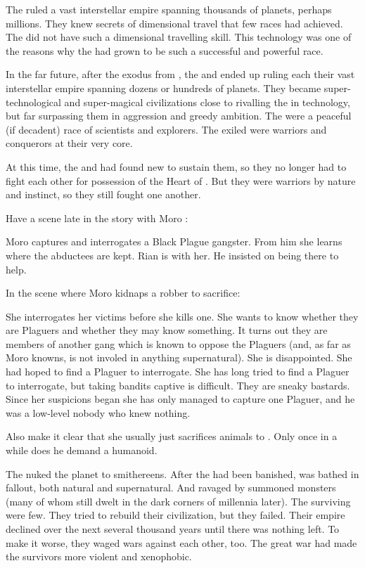 The \xss ruled a vast interstellar empire spanning thousands of planets, perhaps millions. 
They knew secrets of dimensional travel that few races had achieved.
The \banes did not have such a dimensional travelling skill. 
This technology was one of the reasons why the \xss had grown to be such a successful and powerful race. 


In the far future, after the exodus from \Miith, the \dragons and \resphain ended up ruling each their vast interstellar empire spanning dozens or hundreds of planets. 
They became super-technological and super-magical civilizations close to rivalling the \voyagers in technology, but far surpassing them in aggression and greedy ambition. 
The \voyagers were a peaceful (if decadent) race of scientists and explorers. 
The exiled \Miithians were warriors and conquerors at their very core.

At this time, the \dragons and \resphain had found new \dweomers to sustain them, so they no longer had to fight each other for possession of the Heart of \Miith. 
But they were warriors by nature and instinct, so they still fought one another. 



Have a scene late in the story with Moro \Cornel:

  Moro captures and interrogates a Black Plague gangster.
  From him she learns where the abductees are kept. 
  Rian is with her.
  He insisted on being there to help.

In the scene where Moro kidnaps a robber to sacrifice:

  She interrogates her victims before she kills one.
  She wants to know whether they are Plaguers and whether they may know something.
  It turns out they are members of another gang which is known to oppose the Plaguers (and, as far as Moro knowns, is not involed in anything supernatural). 
  She is disappointed.
  She had hoped to find a Plaguer to interrogate.
  She has long tried to find a Plaguer to interrogate, but taking bandits captive is difficult. 
  They are sneaky bastards.
  Since her suspicions began she has only managed to capture one Plaguer, and he was a low-level nobody who knew nothing. 
  
  Also make it clear that she usually just sacrifices animals to \Nasshikerr. 
  Only once in a while does he demand a humanoid.



The \firstbanewar nuked the planet to smithereens. 
After the \banes had been banished, \Miith was bathed in fallout, both natural and supernatural. 
And ravaged by summoned monsters (many of whom still dwelt in the dark corners of \Miith millennia later). 
The surviving \ophidians were few. 
They tried to rebuild their civilization, but they failed. 
Their empire declined over the next several thousand years until there was nothing left. 
To make it worse, they waged wars against each other, too. 
The great war had made the survivors more violent and xenophobic. 



